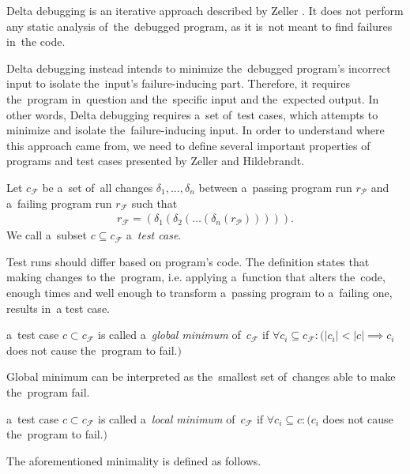 Delta debugging is an iterative approach described by Zeller \citep{Zeller99}.
It does not perform any static analysis of~the~debugged program, as it 
is~not meant to find failures in~the code. 

Delta debugging instead intends to 
minimize the~debugged program's incorrect input to isolate the~input's 
failure-inducing part. 
Therefore, it requires the~program in~question and the~specific input 
and the~expected output. 
In other words, Delta debugging requires a~set of~test cases, which attempts to 
minimize and isolate the~failure-inducing input. 
In order to understand where
this app\-roach came from, we need to define several important properties of~
programs and test cases presented by Zeller and Hildebrandt\citep*{Zeller02}.

\begin{defn}\label{def02:1}
  Let $c_\mathcal{F}$ be a~set of~all changes $\delta_1,\dots,\delta_n$ 
  between a~passing program run $r_\mathcal{P}$ and a~failing program run
  $r_\mathcal{F}$ such that 
  \begin{align}
	r_\mathcal{F} = (\delta_1(\delta_2(\dots(\delta_n(r_\mathcal{P}))))). \nonumber 
  \end{align}
  We call a~subset $c \subseteq c_\mathcal{F}$ a~\emph{test case}.
\end{defn}

Test runs should differ based on program's code. 
The definition states that making changes to the~program,
i.e. applying a~function that alters the~code, enough times
and well enough to transform a~passing program to a~failing one,
results in~a test case.

\begin{defn}\label{def02:2}
  a~test case $c \subset c_\mathcal{F}$ is called a~\emph{global minimum}
  of~$c_\mathcal{F}$ if $\forall c_i \subseteq c_\mathcal{F}:
  (|c_i| < |c| \implies c_i$ does not cause the~program to fail.$)$
\end{defn}

Global minimum can be interpreted as the~smallest set of~changes able to
make the~program fail.

\begin{defn}\label{def02:3}
  a~test case $c \subset c_\mathcal{F}$ is called a~\emph{local minimum}
  of~$c_\mathcal{F}$ if $\forall c_i \subseteq c:
  (c_i$ does not cause the~program to fail.$)$
\end{defn}

The aforementioned minimality is defined as follows.

